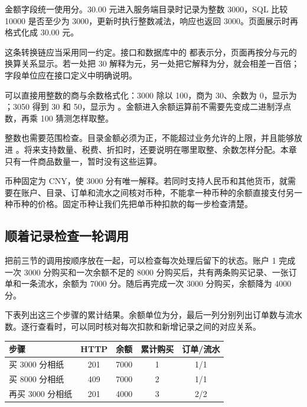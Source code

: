 金额字段统一使用分。30.00 元进入服务端目录时记录为整数 3000，SQL 比较 10000 是否至少为 3000，更新时执行整数减法，响应也返回 3000。页面展示时再格式化成 30.00 元。

这条转换链应当采用同一约定。接口和数据库中的  都表示分，页面再按分与元的换算关系显示。若一处把 30 解释为元，另一处把它解释为分，就会相差一百倍；字段单位应在接口定义中明确说明。

可以直接用整数的商与余数格式化：3000 除以 100，商为 30、余数为 0，显示为 ；3050 得到 30 和 50，显示为 。金额进入余额运算前不需要先变成二进制浮点数，再乘 100 猜测怎样取整。

整数也需要范围检查。目录金额必须为正，不能超过业务允许的上限，并且能够放进 。将来支持数量、税费、折扣时，还要说明在哪里取整、余数怎样分配。本章只有一件商品数量一，暂时没有这些运算。

币种固定为 CNY，使 3000 分有唯一解释。若同时支持人民币和其他货币，就需要在账户、目录、订单和流水之间核对币种，不能拿一种币种的余额直接支付另一种币种的价格。固定币种让我们先把单币种扣款的每一步检查清楚。

\subsection*{顺着记录检查一轮调用}

把前三节的调用按顺序放在一起，可以检查每次处理后留下的状态。账户 1 完成一次 3000 分购买和一次余额不足的 8000 分购买后，共有两条购买记录、一张订单和一条流水，余额为 7000 分。随后再完成一次 3000 分购买，余额降为 4000 分。

下表列出这三个步骤的累计结果。余额单位为分，最后一列分别列出订单数与流水数。逐行查看时，可以同时核对每次扣款和新增记录之间的对应关系。

\begin{center}
\begin{minipage}{\linewidth}
\centering\small\captionsetup{hypcap=false}
\begin{tabularx}{\linewidth}{Xcccc}
\toprule
\textbf{步骤} & \textbf{HTTP} & \textbf{余额} & \textbf{累计购买} & \textbf{订单/流水} \\
\midrule
买 3000 分相纸 & 201 & 7000 & 1 & 1/1 \\
买 8000 分相纸 & 409 & 7000 & 2 & 1/1 \\
再买 3000 分相纸 & 201 & 4000 & 3 & 2/2 \\
\bottomrule
\end{tabularx}
\end{minipage}
\end{center}

